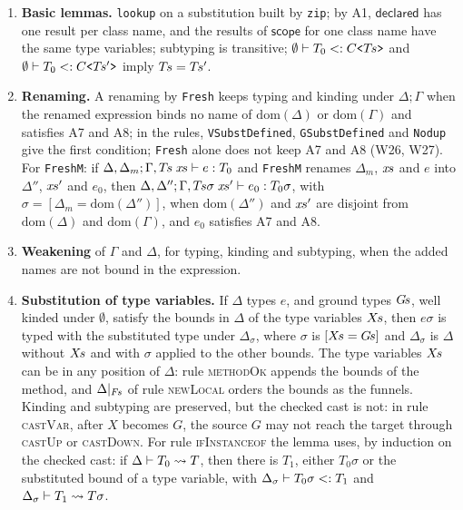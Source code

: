 \begin{enumerate}
\item \textbf{Basic lemmas.} \texttt{lookup} on a substitution built by \texttt{zip}; by A1, $\mathsf{declared}$ has one result per class name, and the results of $\mathsf{scope}$ for one class name have the same type variables; subtyping is transitive; $\emptyset\vdash T_0 <: C\text{\ttfamily <}T\mkern-2mu s\text{\ttfamily >}$ and $\emptyset\vdash T_0 <: C\text{\ttfamily <}T\mkern-2mu s'\text{\ttfamily >}$ imply $T\mkern-2mu s=T\mkern-2mu s'$.
\item \textbf{Renaming.} A renaming by \texttt{Fresh} keeps typing and kinding under $\Delta;\Gamma$ when the renamed expression binds no name of $\mathrm{dom}(\Delta)$ or $\mathrm{dom}(\Gamma)$ and satisfies A7 and A8; in the rules, \texttt{VSubstDefined}, \texttt{GSubstDefined} and \texttt{Nodup} give the first condition; \texttt{Fresh} alone does not keep A7 and A8 (W26, W27).
For \texttt{FreshM}: if $\Delta,\Delta_m;\Gamma,T\mkern-2mu s\mskip5mux\mkern-2mu s\vdash e : T_0$ and \texttt{FreshM} renames $\Delta_m$, $x\mkern-2mu s$ and $e$ into $\Delta''$, $x\mkern-2mu s'$ and $e_0$, then $\Delta,\Delta'';\Gamma,T\mkern-2mu s\sigma\mskip5mux\mkern-2mu s'\vdash e_0 : T_0\sigma$, with $\sigma=[\Delta_m=\mathrm{dom}(\Delta'')]$, when $\mathrm{dom}(\Delta'')$ and $x\mkern-2mu s'$ are disjoint from $\mathrm{dom}(\Delta)$ and $\mathrm{dom}(\Gamma)$, and $e_0$ satisfies A7 and A8.
\item \textbf{Weakening} of $\Gamma$ and $\Delta$, for typing, kinding and subtyping, when the added names are not bound in the expression.
\item \textbf{Substitution of type variables.} If $\Delta$ types $e$, and ground types $G\mkern-2mu s$, well kinded under $\emptyset$, satisfy the bounds in $\Delta$ of the type variables $X\mkern-2mu s$, then $e\sigma$ is typed with the substituted type under $\Delta_\sigma$, where $\sigma$ is $[X\mkern-2mu s=G\mkern-2mu s]$ and $\Delta_\sigma$ is $\Delta$ without $X\mkern-2mu s$ and with $\sigma$ applied to the other bounds.
The type variables $X\mkern-2mu s$ can be in any position of $\Delta$: rule \textsc{methodOk} appends the bounds of the method, and $\Delta|_{F\mkern-2mu s}$ of rule \textsc{newLocal} orders the bounds as the funnels.
Kinding and subtyping are preserved, but the checked cast is not: in rule \textsc{castVar}, after $X$ becomes $G$, the source $G$ may not reach the target through \textsc{castUp} or \textsc{castDown}.
For rule \textsc{ifInstanceof} the lemma uses, by induction on the checked cast: if $\Delta\vdash T_0 \rightsquigarrow T$, then there is $T_1$, either $T_0\sigma$ or the substituted bound of a type variable, with $\Delta_\sigma\vdash T_0\sigma <: T_1$ and $\Delta_\sigma\vdash T_1 \rightsquigarrow T\sigma$.

\end{enumerate}
